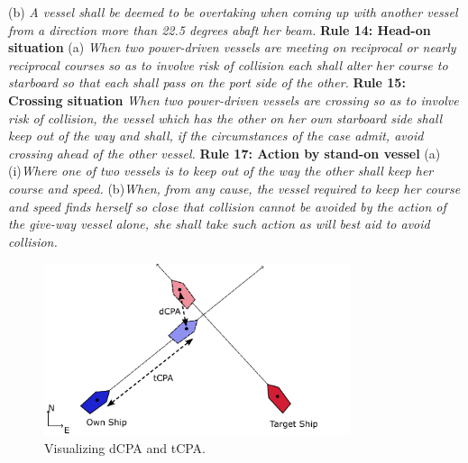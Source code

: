 (b) \textit{A vessel shall be deemed to be overtaking when coming up with another vessel from a direction more than 22.5 degrees abaft her beam.}\newline
\textbf{Rule 14: Head-on situation}\newline
(a) \textit{When two power-driven vessels are meeting on reciprocal or nearly reciprocal courses so as to involve risk of collision each shall alter her 
course to starboard so that each shall pass on the port side of the other.}\newline
\textbf{Rule 15: Crossing situation}\newline
\textit{When two power-driven vessels are crossing so as to involve risk of collision, the vessel which has the other on her own starboard 
side shall keep out of the way and shall, if the circumstances of the case admit, avoid crossing ahead of the other vessel.}\newline
\textbf{Rule 17: Action by stand-on vessel}\newline
(a)(i)\textit{Where one of two vessels is to keep out of the way the other shall keep her course and speed.}\newline
(b)\textit{When, from any cause, the vessel required to keep her course and speed finds herself so close that collision 
cannot be avoided by the action of the give-way vessel alone, she shall take such action as will best aid to avoid collision.}


\begin{figure}[ht!]
    \centering
    \includegraphics[width=0.8\textwidth]{Images/shipCPA.pdf}
    \caption{Visualizing dCPA and tCPA.}
    \label{FIG: ship CPA}
\end{figure}

